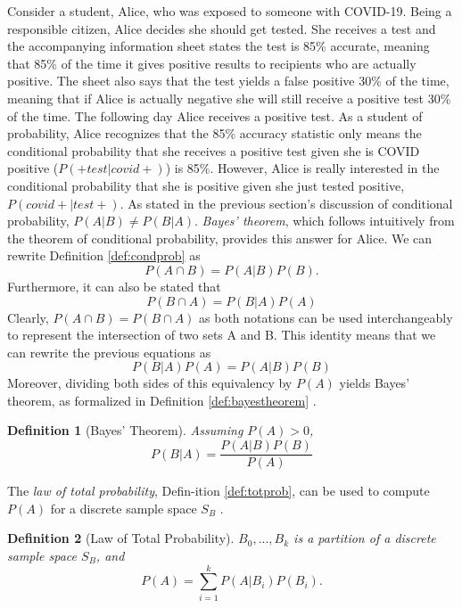 \documentclass[
  12pt,
  oneside]{book}
\theoremstyle{definition}
\newtheorem{definition}{Definition}[chapter]
\theoremstyle{definition}
\theoremstyle{definition}
\theoremstyle{remark}
\begin{document}
Consider a student, Alice, who was exposed to someone with COVID-19.
Being a responsible citizen, Alice decides she should get tested.
She receives a test and the accompanying information sheet states the test is 85\% accurate, meaning that 85\% of the time it gives positive results to recipients who are actually positive. The sheet also says that the test yields a false positive 30\% of the time, meaning that if Alice is actually negative she will still receive a positive test 30\% of the time.
The following day Alice receives a positive test.
As a student of probability, Alice recognizes that the 85\% accuracy statistic only means the conditional probability that she receives a positive test given she is COVID positive (\(P(+ test|covid+)\)) is 85\%.
However, Alice is really interested in the conditional probability that she is positive given she just tested positive, \(P(covid+|test+)\).
As stated in the previous section's discussion of conditional probability, \(P(A|B) \neq P(B|A)\).
\emph{Bayes' theorem}, which follows intuitively from the theorem of conditional probability, provides this answer for Alice.
We can rewrite Definition \ref{def:condprob} as
\[P(A \cap B)=P(A|B)P(B).\]
Furthermore, it can also be stated that
\[P(B \cap A)=P(B|A)P(A)\]
Clearly, \(P(A \cap B)=P(B \cap A)\) as both notations can be used interchangeably to represent the intersection of two sets A and B.
This identity means that we can rewrite the previous equations as
\[P(B|A)P(A)=P(A|B)P(B)\]
Moreover, dividing both sides of this equivalency by \(P(A)\) yields Bayes' theorem, as formalized in Definition \ref{def:bayestheorem} \citep{Junker2003}.

\begin{definition}[Bayes' Theorem]
\protect\hypertarget{def:bayestheorem}{}{\label{def:bayestheorem} {} }\emph{Assuming \(P(A)>0\),}
\[P(B|A)=\frac{P(A|B)P(B)}{P(A)}\]
\end{definition}

The \emph{law of total probability}, Defin-ition \ref{def:totprob}, can be used to compute \(P(A)\) for a discrete sample space \(S_{B}\) \citep[  1.7]{Wasserman2004}.

\begin{definition}[Law of Total Probability]
\protect\hypertarget{def:totprob}{}{\label{def:totprob} {} }\emph{\(B_{0},...,B_{k}\) is a partition of a discrete sample space \(S_{B}\), and}
\[P(A)=\sum_{i=1}^{k}P(A|B_{i})P(B_{i}).\]
\end{definition}
\end{document}
